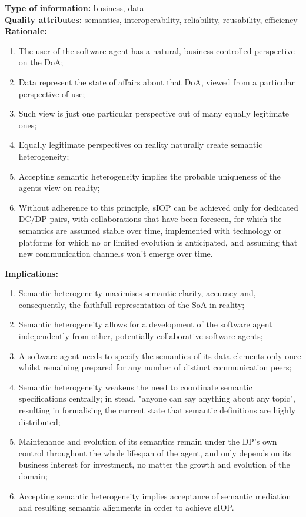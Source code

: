 \documentclass[sort&compress,preprint,authoryear,3p,twocolumn]{elsarticle}
\begin{document}
\begin{mmdp}
\textbf{Type of information:} business, data  \\
\textbf{Quality attributes:} semantics, interoperability, reliability, reusability, efficiency   \\
\textbf{Rationale:}
\begin{enumerate}
  \item The user of the software agent has a natural, business controlled perspective on the DoA;
  \item Data represent the state of affairs about that DoA, viewed from a particular perspective of use;
  \item Such view is just one particular perspective out of many equally legitimate ones;
  \item Equally legitimate perspectives on reality naturally create semantic heterogeneity;
  \item Accepting semantic heterogeneity implies the probable uniqueness of the agents view on reality;
  \item Without adherence to this principle, sIOP can be achieved only for dedicated DC/DP pairs, with collaborations that have been foreseen, for which the semantics are assumed stable over time, implemented with technology or platforms for which no or limited evolution is anticipated, and assuming that new communication channels won't emerge over time.
\end{enumerate}
\textbf{Implications:}
\begin{enumerate}
  \item Semantic heterogeneity maximises semantic clarity, accuracy and, consequently, the faithfull representation of the SoA in reality;
  \item Semantic heterogeneity allows for a development of the software agent independently from other, potentially collaborative software agents;
  \item A software agent needs to specify the semantics of its data elements only once whilst remaining prepared for any number of distinct communication peers;
  \item Semantic heterogeneity weakens the need to coordinate semantic specifications centrally; in stead, "anyone can say anything about any topic", resulting in formalising the current state that semantic definitions are highly distributed;
  \item Maintenance and evolution of its semantics remain under the DP's own control throughout the whole lifespan of the agent, and only depends on its business interest for investment, no matter the growth and evolution of the domain;
  \item Accepting semantic heterogeneity implies acceptance of semantic mediation and resulting semantic alignments in order to achieve sIOP.
\end{enumerate}  
\end{mmdp}
\end{document}
